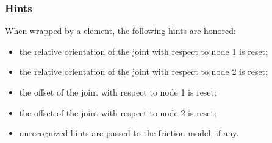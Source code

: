 \subsubsection{Hints}
When wrapped by a  element, the following hints are honored:
\begin{itemize}
\item {} the relative orientation of the joint
with respect to node 1 is reset;
\item {} the relative orientation of the joint
with respect to node 2 is reset;
\item {} the offset of the joint
with respect to node 1 is reset;
\item {} the offset of the joint
with respect to node 2 is reset;
\item unrecognized hints are passed to the friction model, if any.
\end{itemize}





